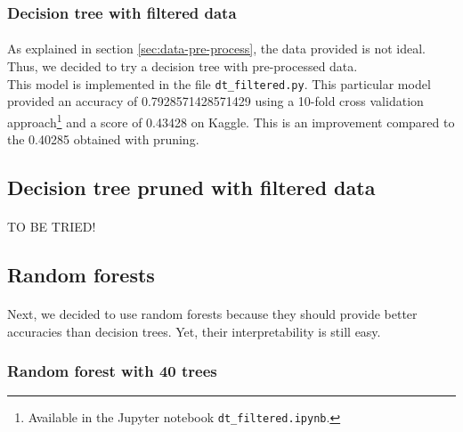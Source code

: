 \documentclass[a4paper, 11pt, oneside]{article}
\begin{document}
\subsubsection{Decision tree with filtered data}
\paragraph{}As explained in section \ref{sec:data-pre-process}, the data provided is not ideal. Thus, we decided to try a decision tree with pre-processed data.\\
This model is implemented in the file \texttt{dt\_filtered.py}. This particular model provided an accuracy of 0.7928571428571429 using a 10-fold cross validation approach\footnote{Available in the Jupyter notebook \texttt{dt\_filtered.ipynb}.} and a score of 0.43428 on Kaggle. This is an improvement compared to the 0.40285 obtained with pruning.

\subsection{Decision tree pruned with filtered data}
\paragraph{}TO BE TRIED!


\subsection{Random forests}
\paragraph{}Next, we decided to use random forests because they should provide better accuracies than decision trees. Yet, their interpretability is still easy.

\subsubsection{Random forest with 40 trees}
\end{document}
